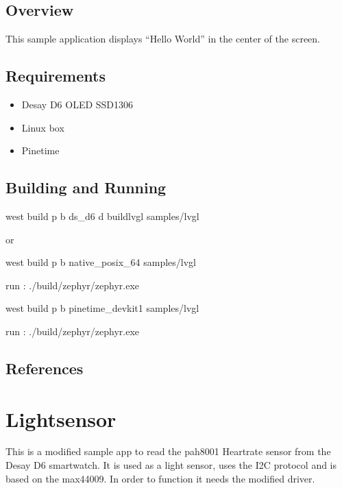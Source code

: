 \documentclass[letterpaper,10pt,english]{sphinxmanual}
\begin{document}
\subsection{Overview}
\label{\detokenize{samples/sampleslvglREADME:overview}}
This sample application displays “Hello World” in the center of the screen.


\subsection{Requirements}
\label{\detokenize{samples/sampleslvglREADME:requirements}}\begin{itemize}
\item {} 
Desay D6 OLED SSD1306

\item {} 
Linux box

\item {} 
Pinetime

\end{itemize}


\subsection{Building and Running}
\label{\detokenize{samples/sampleslvglREADME:building-and-running}}
west build \sphinxhyphen{}p \sphinxhyphen{}b ds\_d6 \sphinxhyphen{}d build\sphinxhyphen{}lvgl samples/lvgl

or

west build \sphinxhyphen{}p \sphinxhyphen{}b native\_posix\_64 samples/lvgl

run : ./build/zephyr/zephyr.exe

west build \sphinxhyphen{}p \sphinxhyphen{}b pinetime\_devkit1 samples/lvgl

run : ./build/zephyr/zephyr.exe


\subsection{References}
\label{\detokenize{samples/sampleslvglREADME:references}}

\section{Lightsensor}
\label{\detokenize{samples/samplesmax44009README:lightsensor}}\label{\detokenize{samples/samplesmax44009README::doc}}
This is a modified sample app to read the pah8001 Heartrate sensor from the Desay D6 smartwatch.
It is used as a light sensor, uses the I2C protocol and is based on the max44009.
In order to function it needs the modified driver.
\end{document}
